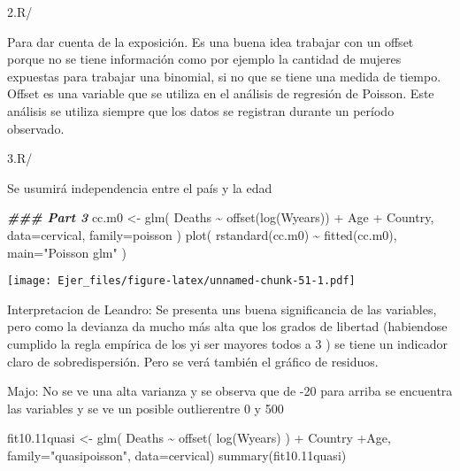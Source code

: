 \documentclass[
]{article}
\newenvironment{Shaded}{\begin{snugshade}}{\end{snugshade}}
\newcommand{\AttributeTok}[1]{\textcolor[rgb]{0.77,0.63,0.00}{#1}}
\newcommand{\DocumentationTok}[1]{\textcolor[rgb]{0.56,0.35,0.01}{\textbf{\textit{#1}}}}
\newcommand{\FloatTok}[1]{\textcolor[rgb]{0.00,0.00,0.81}{#1}}
\newcommand{\FunctionTok}[1]{\textcolor[rgb]{0.00,0.00,0.00}{#1}}
\newcommand{\NormalTok}[1]{#1}
\newcommand{\OtherTok}[1]{\textcolor[rgb]{0.56,0.35,0.01}{#1}}
\newcommand{\SpecialCharTok}[1]{\textcolor[rgb]{0.00,0.00,0.00}{#1}}
\newcommand{\StringTok}[1]{\textcolor[rgb]{0.31,0.60,0.02}{#1}}
\begin{document}
2.R/

Para dar cuenta de la exposición. Es una buena idea trabajar con un
offset porque no se tiene información como por ejemplo la cantidad de
mujeres expuestas para trabajar una binomial, si no que se tiene una
medida de tiempo. Offset es una variable que se utiliza en el análisis
de regresión de Poisson. Este análisis se utiliza siempre que los datos
se registran durante un período observado.

3.R/

Se usumirá independencia entre el país y la edad

\begin{Shaded}
\begin{Highlighting}[]
\DocumentationTok{\#\#\# Part 3}
\NormalTok{ cc.m0 }\OtherTok{\textless{}{-}} \FunctionTok{glm}\NormalTok{( Deaths }\SpecialCharTok{\textasciitilde{}} \FunctionTok{offset}\NormalTok{(}\FunctionTok{log}\NormalTok{(Wyears)) }\SpecialCharTok{+}\NormalTok{ Age }\SpecialCharTok{+}\NormalTok{ Country,}
\AttributeTok{data=}\NormalTok{cervical, }\AttributeTok{family=}\NormalTok{poisson )}
 \FunctionTok{plot}\NormalTok{( }\FunctionTok{rstandard}\NormalTok{(cc.m0) }\SpecialCharTok{\textasciitilde{}} \FunctionTok{fitted}\NormalTok{(cc.m0), }\AttributeTok{main=}\StringTok{"Poisson glm"}\NormalTok{ )}
\end{Highlighting}
\end{Shaded}

\texttt{[image: Ejer\_files/figure-latex/unnamed-chunk-51-1.pdf]}

Interpretacion de Leandro: Se presenta uns buena significancia de las
variables, pero como la devianza da mucho más alta que los grados de
libertad (habiendose cumplido la regla empírica de los yi ser mayores
todos a 3 ) se tiene un indicador claro de sobredispersión. Pero se verá
también el gráfico de residuos.

Majo: No se ve una alta varianza y se observa que de -20 para arriba se
encuentra las variables y se ve un posible outlierentre 0 y 500

\begin{Shaded}
\begin{Highlighting}[]
\NormalTok{fit10}\FloatTok{.11}\NormalTok{quasi }\OtherTok{\textless{}{-}} \FunctionTok{glm}\NormalTok{( Deaths }\SpecialCharTok{\textasciitilde{}} \FunctionTok{offset}\NormalTok{( }\FunctionTok{log}\NormalTok{(Wyears) ) }\SpecialCharTok{+}\NormalTok{ Country }\SpecialCharTok{+}\NormalTok{Age,}
\AttributeTok{family=}\StringTok{"quasipoisson"}\NormalTok{, }\AttributeTok{data=}\NormalTok{cervical)}
\FunctionTok{summary}\NormalTok{(fit10}\FloatTok{.11}\NormalTok{quasi)}
\end{Highlighting}
\end{Shaded}
\end{document}
